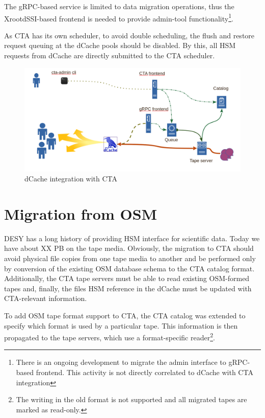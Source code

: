 \documentclass{webofc}
\begin{document}
The gRPC-based service is limited to data migration operations, thus the XrootdSSI-based frontend is needed to provide admin-tool functionality\footnote{There is an ongoing development to migrate the admin interface to gRPC-based\cite{grpc} frontend. This activity is not directly correlated to dCache with CTA integration}.

As CTA has its own scheduler, to avoid double scheduling,  the flush and restore request queuing at the dCache pools should be disabled. By this, all HSM requests from dCache are directly submitted to the CTA scheduler.

\begin{figure}[h]
    \centering
    \includegraphics[scale=0.25]{dcache-cta-integration.png}
    \caption{dCache integration with CTA}
    \label{fig:dcache_integration}
\end{figure}

\section{Migration from OSM}
\label{migraion}

DESY has a long history of providing HSM interface for scientific data. Today we have about XX PB on the tape media. Obviously, the migration to CTA should avoid physical file copies from one tape media to another and be performed only by conversion of the existing OSM database schema to the CTA catalog format. Additionally, the CTA tape servers must be able to read existing OSM-formed tapes and, finally, the files HSM reference in the dCache must be updated with CTA-relevant information.

To add OSM tape format support to CTA, the CTA catalog was extended to specify 
which format is used by a particular tape. This information is then propagated to the tape servers, which use a format-specific reader\footnote{The writing in the old format is not supported and all migrated tapes are marked as read-only.}.
\end{document}
